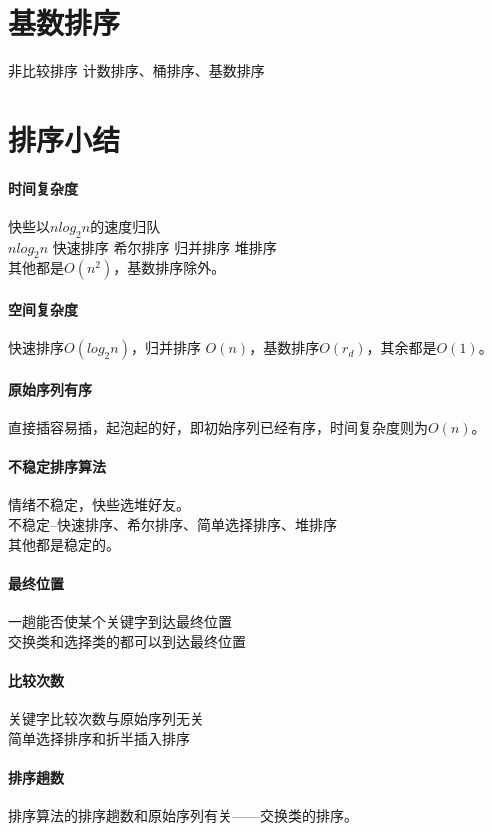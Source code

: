 \section{基数排序}

非比较排序
计数排序、桶排序、基数排序

\section{排序小结}
\paragraph{时间复杂度}
快些以$nlog_2 n$的速度归队 \\
$nlog_2 n$ 快速排序 希尔排序 归并排序 堆排序 \\
其他都是$O(n^2)$，基数排序除外。 \\

\paragraph{空间复杂度}
快速排序$O(log_2 n)$，归并排序 $O(n)$，基数排序$O(r_d)$，其余都是$O(1)$。

\paragraph{原始序列有序}
直接插容易插，起泡起的好，即初始序列已经有序，时间复杂度则为$O(n)$。

\paragraph{不稳定排序算法}
情绪不稳定，快些选堆好友。 \\
不稳定--快速排序、希尔排序、简单选择排序、堆排序 \\
其他都是稳定的。 \\

\paragraph{最终位置}
一趟能否使某个关键字到达最终位置 \\
交换类和选择类的都可以到达最终位置 \\

\paragraph{比较次数}
关键字比较次数与原始序列无关 \\
简单选择排序和折半插入排序 \\

\paragraph{排序趟数}
排序算法的排序趟数和原始序列有关——交换类的排序。 \\


